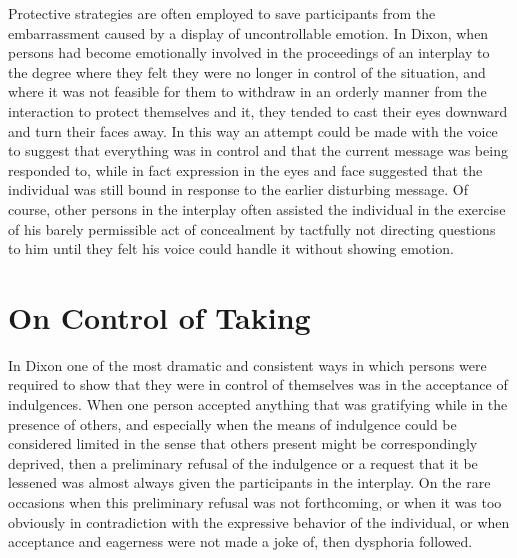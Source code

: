 \documentclass[openany,nobib]{tufte-book}
\begin{document}
Protective strategies are often employed to save participants from the
embarrassment caused by a display of uncontrollable emotion. In Dixon,
when persons had become emotionally involved in the proceedings of an
interplay to the degree where they felt they were no longer in control
of the situation, and where it was not feasible for them to withdraw in
an orderly manner from the interaction to protect themselves and it,
they tended to cast their eyes downward and turn their faces away. In
this way an attempt could be made with the voice to suggest that
everything was in control and that the current message was being
responded to, while in fact expression in the eyes and face suggested
that the individual was still bound in response to the earlier
disturbing message. Of course, other persons in the interplay often
assisted the individual in the exercise of his barely permissible act of
concealment by tactfully not directing questions to him until they felt
his voice could handle it without showing emotion.

\hypertarget{on-control-of-taking}{%
\section{On Control of Taking}\label{on-control-of-taking}}

In Dixon one of the most dramatic and consistent ways in which persons
were required to show that they were in control of themselves was in the
acceptance of indulgences. When one person accepted anything that was
gratifying while in the presence of others, and especially when the
means of indulgence could be considered limited in the sense that others
present might be correspondingly deprived, then a preliminary refusal of
the indulgence or a request that it be lessened was almost always given
the participants in the interplay. On the rare occasions when this
preliminary refusal was not forthcoming, or when it was too obviously in
contradiction with the expressive behavior of the individual, or when
acceptance and eagerness were not made a joke of, then dysphoria
followed.
\end{document}
